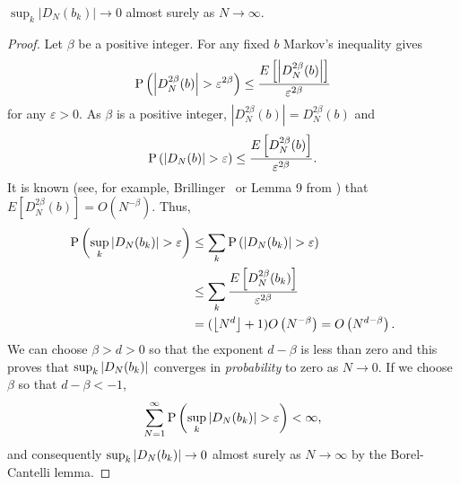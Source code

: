 \documentclass[journal]{IEEEtran}
\begin{document}
\begin{lemma} \label{lem:DNij->0}
$\sup_{k}\vert D_N(b_k)\vert \rightarrow 0$ almost surely as $N\rightarrow \infty$.
 \end{lemma}
\begin{proof}
Let $\beta$ be a positive integer.  For any fixed $b$ Markov's inequality gives
\[
 \operatorname{P}\left(\left\vert D_N^{2\beta}(b) \right\vert > \varepsilon^{2\beta}\right) \leq \frac{E\left[  \left\vert D_{N}^{2\beta}(b) \right\vert \right]  }{\varepsilon^{2\beta}}
\] 
for any $\varepsilon > 0$. As $\beta$ is a positive integer, $\left|D_N^{2\beta}(b)\right| = D_{N}^{2\beta}(b)$ and
\[
\operatorname{P}\left(\left\vert D_N(b) \right\vert > \varepsilon\right) \leq \frac{E \left[ D_N^{2\beta}(b) \right] }{\varepsilon^{2\beta}}.
\]
It is known (see, for example, Brillinger~\cite{Brillinger1962_moment_bounds_iid} or Lemma 9 from \cite{McKilliamFrequencyEstimationByPhaseUnwrapping2009}) that $E\left[ D_N^{2\beta}(b) \right] = O\left(N^{-\beta}\right)$.  Thus,
 \begin{align*}
 \operatorname{P}\left(  \sup_{k}{\left| D_N(b_k) \right|} >\varepsilon\right)  &\leq \sum_{k } \operatorname{P} \left( {\left| D_N(b_k) \right|} >\varepsilon\right) \\
 &\leq \sum_{k } \frac{E \left[ D_N^{2\beta}(b_k) \right] }{\varepsilon^{2\beta}} \\
&= ({\left\lfloor N^d \right\rfloor} + 1)O\left(N^{-\beta}\right) = O\left(N^{d - \beta}\right).
\end{align*}
We can choose $\beta > d > 0$ so that the exponent $d - \beta$ is less than zero and this proves that $\sup_{k }{\left| D_N(b_k) \right|}$ converges in \emph{probability} to zero as $N \rightarrow 0$. If we choose $\beta$ so that $d - \beta < -1$,
\[
 \sum_{N=1}^{\infty}\operatorname{P}\left(  \sup_{k }{\left| D_N(b_k) \right|} >\varepsilon\right) < \infty,
\]
and consequently $\sup_{k }{\left|  D_N(b_k) \right|} \rightarrow 0$ almost surely as $N\rightarrow\infty$ by the Borel-Cantelli lemma.%
\end{proof}
\end{document}
